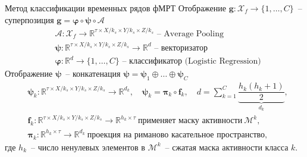 \documentclass[aspectratio=43]{beamer}
\begin{document}
\begin{frame}{Метод классификации временных рядов фМРТ}
\small
Отображение $\mathbf{g}: \mathcal{X}_{f} \rightarrow \{1,\ldots, C\}$~-- суперпозиция $\mathbf{g} = \bm{\varphi} \circ \bm{\psi} \circ \mathcal{A}$
\begin{align*}
    & \mathcal{A}: \mathcal{X}_{f} \to \mathbb{R}^{\tau \times X/k_s \times Y/k_s \times Z/k_s}
    \text{~-- Average Pooling}        \\
    & \bm{\psi}: \mathbb{R}^{\tau \times X/k_s \times Y/k_s \times Z/k_s} \to \mathbb{R}^d
    \text{~-- векторизатор}        \\
    & \bm{\varphi}: \mathbb{R}^d \to \{1,\ldots, C\}
    \text{~-- классификатор (Logistic Regression)}
\end{align*}
Отображение $\bm{\psi}$~-- конкатенация $\bm{\psi} = \bm{\psi}_1 \oplus \ldots \oplus \bm{\psi}_C$
\begin{align*}
    & \bm{\psi}_k: \mathbb{R}^{\tau \times X/k_s \times Y/k_s \times Z/k_s} \rightarrow \mathbb{R}^{d_k},
    \quad \bm{\psi}_k = \bm{\pi}_k \circ \bm{f}_k,
    \quad d = \sum_{k=1}^C \underbrace{\dfrac{h_k(h_k+1)}{2}}_{\textstyle d_k}, \\
    & \bm{f}_k: \mathbb{R}^{\tau \times X/k_s \times Y/k_s \times Z/k_s} \rightarrow \mathbb{R}^{h_k \times \tau}~\text{применяет маску активности}~\mathcal{M}^k, \\
    & \bm{\pi}_k: \mathbb{R}^{h_k \times \tau} \rightarrow \mathbb{R}^{d_k}~\text{проекция на риманово касательное пространство,}
\end{align*}
где $h_k$~-- число ненулевых элементов в $\mathcal{M}^k$~-- сжатая маска активности класса $k$.
\end{frame}
\end{document}
